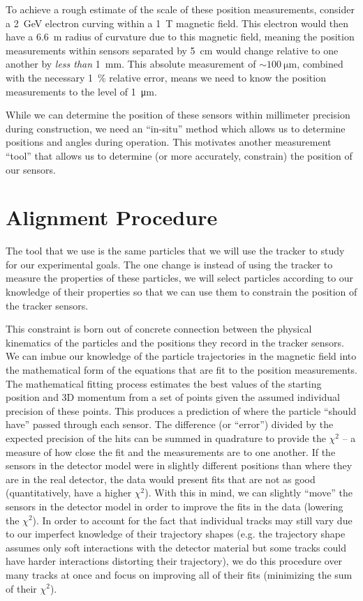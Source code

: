 To achieve a rough estimate of the scale of these position measurements, consider a
\qty{2}{\giga\electronvolt} electron curving within a \qty{1}{\tesla} magnetic field. This electron
would then have a \qty{6.6}{\meter} radius of curvature due to this magnetic field, meaning the
position measurements within sensors separated by \qty{5}{\centi\meter} would change relative to
one another by \emph{less than} \qty{1}{\milli\meter}. This absolute measurement of
$\sim\qty{100}{\micro\meter}$, combined with the necessary \qty{1}{\percent} relative error, means we
need to know the position measurements to the level of \qty{1}{\micro\meter}.

While we can determine the position of these sensors within millimeter precision during
construction, we need an ``in-situ'' method which allows us to determine positions
and angles during operation.
This motivates another measurement ``tool'' that allows us to determine (or more
accurately, constrain) the position of our sensors.

\section{Alignment Procedure}
The tool that we use is the same particles that we will use the tracker to study for our
experimental goals. The one change is instead of using the tracker to measure the properties of
these particles, we will select particles according to our knowledge of their properties so that we
can use them to constrain the position of the tracker sensors.

This constraint is born out of concrete connection between the physical kinematics of the particles
and the positions they record in the tracker sensors.
We can imbue our knowledge of the particle trajectories in the magnetic field into the
mathematical form of the equations that are fit to the position measurements.
The mathematical fitting process estimates the best values of the starting position and 3D momentum
from a set of points given the assumed individual precision of these points.
This produces a prediction of where the particle ``should have'' passed through each sensor.
The difference (or ``error'') divided by the expected precision of the hits can be summed
in quadrature to provide the $\chi^2$ -- a measure of how close the fit and the measurements
are to one another.
If the sensors in the detector model were in slightly different
positions than where they are in the real detector, the data would present fits that are not as
good (quantitatively, have a higher $\chi^2$).
With this in mind, we can slightly ``move'' the sensors in the detector model in order to
improve the fits in the data (lowering the $\chi^2$).
In order to account for the fact that individual tracks may still vary due to our
imperfect knowledge of their trajectory shapes (e.g. the trajectory shape assumes only soft
interactions with the detector material but some tracks could have harder interactions distorting
their trajectory), we do this procedure over many tracks at once and focus on improving all of
their fits (minimizing the sum of their $\chi^2$).

